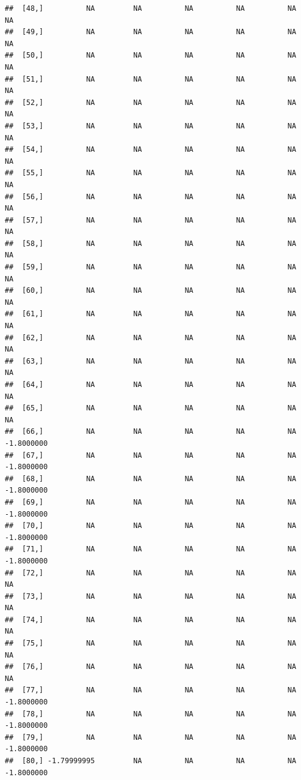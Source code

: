 \documentclass{article}\usepackage[]{graphicx}\usepackage[]{color}
\makeatletter
\newenvironment{kframe}{%
 \def\at@end@of@kframe{}%
 \ifinner\ifhmode%
  \def\at@end@of@kframe{\end{minipage}}%
  \begin{minipage}{\columnwidth}%
 \fi\fi%
 \def\FrameCommand##1{\hskip\@totalleftmargin \hskip-\fboxsep
 \colorbox{shadecolor}{##1}\hskip-\fboxsep
     \hskip-\linewidth \hskip-\@totalleftmargin \hskip\columnwidth}%
 \MakeFramed {\advance\hsize-\width
   \@totalleftmargin\z@ \linewidth\hsize
   \@setminipage}}%
 {\par\unskip\endMakeFramed%
 \at@end@of@kframe}
\newenvironment{knitrout}{}{} %
\makeatother
\begin{document}
\begin{knitrout}
\begin{kframe}
\begin{verbatim}
##  [48,]          NA         NA          NA          NA          NA         NA
##  [49,]          NA         NA          NA          NA          NA         NA
##  [50,]          NA         NA          NA          NA          NA         NA
##  [51,]          NA         NA          NA          NA          NA         NA
##  [52,]          NA         NA          NA          NA          NA         NA
##  [53,]          NA         NA          NA          NA          NA         NA
##  [54,]          NA         NA          NA          NA          NA         NA
##  [55,]          NA         NA          NA          NA          NA         NA
##  [56,]          NA         NA          NA          NA          NA         NA
##  [57,]          NA         NA          NA          NA          NA         NA
##  [58,]          NA         NA          NA          NA          NA         NA
##  [59,]          NA         NA          NA          NA          NA         NA
##  [60,]          NA         NA          NA          NA          NA         NA
##  [61,]          NA         NA          NA          NA          NA         NA
##  [62,]          NA         NA          NA          NA          NA         NA
##  [63,]          NA         NA          NA          NA          NA         NA
##  [64,]          NA         NA          NA          NA          NA         NA
##  [65,]          NA         NA          NA          NA          NA         NA
##  [66,]          NA         NA          NA          NA          NA -1.8000000
##  [67,]          NA         NA          NA          NA          NA -1.8000000
##  [68,]          NA         NA          NA          NA          NA -1.8000000
##  [69,]          NA         NA          NA          NA          NA -1.8000000
##  [70,]          NA         NA          NA          NA          NA -1.8000000
##  [71,]          NA         NA          NA          NA          NA -1.8000000
##  [72,]          NA         NA          NA          NA          NA         NA
##  [73,]          NA         NA          NA          NA          NA         NA
##  [74,]          NA         NA          NA          NA          NA         NA
##  [75,]          NA         NA          NA          NA          NA         NA
##  [76,]          NA         NA          NA          NA          NA         NA
##  [77,]          NA         NA          NA          NA          NA -1.8000000
##  [78,]          NA         NA          NA          NA          NA -1.8000000
##  [79,]          NA         NA          NA          NA          NA -1.8000000
##  [80,] -1.79999995         NA          NA          NA          NA -1.8000000

\end{verbatim}
\end{kframe}
\end{knitrout}
\end{document}
